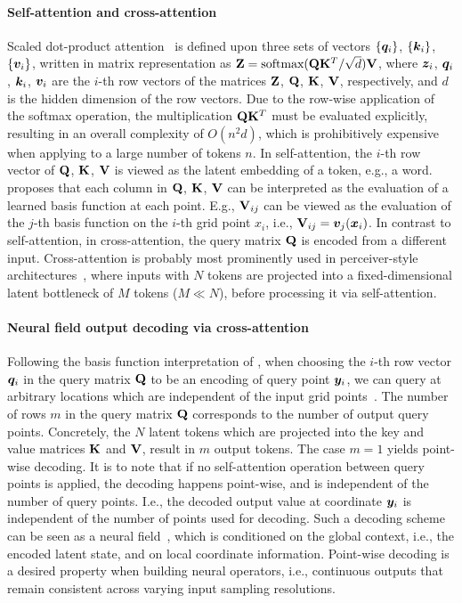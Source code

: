 \paragraph{Self-attention and cross-attention} Scaled dot-product attention~\cite{Vaswani:17} is defined upon three sets of vectors $\{\bm{q}_i \}$, $\{\bm{k}_i \}$, $\{\bm{v}_i \}$, written in matrix representation as $\mathbf{Z} = \text{softmax} (\mathbf{Q} \mathbf{K}^T/\sqrt{d})\mathbf{V}$,  where $\bm{z}_i$, $\bm{q}_i$, $\bm{k}_i$, $\bm{v}_i$ are the $i$-th row vectors of the matrices $\mathbf{Z}$, $\mathbf{Q}$, $\mathbf{K}$, $\mathbf{V}$, respectively, and $d$ is the hidden dimension of the row vectors. 
Due to the row-wise application of the softmax operation, the multiplication $\mathbf{Q}\mathbf{K}^T$ must be evaluated explicitly, resulting in an overall complexity of $O(n^2d)$, which is prohibitively expensive when applying to a large number of tokens $n$. 
In self-attention, the $i$-th row vector of $\mathbf{Q}$, $\mathbf{K}$, $\mathbf{V}$ is viewed as the latent embedding of a token, e.g., a word. 
\citet{Cao:21} proposes that each column in $\mathbf{Q}$, $\mathbf{K}$, $\mathbf{V}$ can be interpreted as the evaluation of a learned basis function at each point.  
E.g., $\mathbf{V}_{ij}$ can be viewed as the evaluation of the $j$-th basis function on the $i$-th grid point $x_i$, i.e., $\mathbf{V}_{ij} = \bm{v}_j (\bm{x}_i)$. In contrast to self-attention, in cross-attention, the query matrix $\mathbf{Q}$ is encoded from a different input. 
Cross-attention is probably most prominently used in perceiver-style architectures~\cite{jaegle2021perceiver}, where inputs with $N$ tokens are projected into a fixed-dimensional latent bottleneck of $M$ tokens ($M \ll N$), before processing it via self-attention. 

\paragraph{Neural field output decoding via cross-attention}  
Following the basis function interpretation of \citet{Cao:21}, when choosing the $i$-th row vector $\bm{q}_i$
in the query matrix $\mathbf{Q}$ to be an encoding of query point $\bm{y}_i$, we can query at arbitrary locations which are independent of the input grid points~\cite{Li:OFormer,alkin2024universal,wang2024cvit}. The number of rows $m$ in the query matrix $\mathbf{Q}$ corresponds to the number of output query points. Concretely, the $N$ latent tokens which are projected into the key and value matrices $\mathbf{K}$ and $\mathbf{V}$, result in $m$ output tokens. The case $m=1$ yields point-wise decoding.
It is to note that if no self-attention operation between query points is applied, the decoding happens point-wise, and is independent of the number of query points. I.e., the decoded output value at coordinate $\bm{y}_i$ is independent of the number of points used for decoding. Such a decoding scheme can be seen as a neural field~\cite{wang2024cvit}, which is conditioned on the global context, i.e., the encoded latent state, and on local coordinate information. Point-wise decoding is a desired property when building neural operators, i.e., continuous outputs that remain consistent across varying input sampling resolutions.

